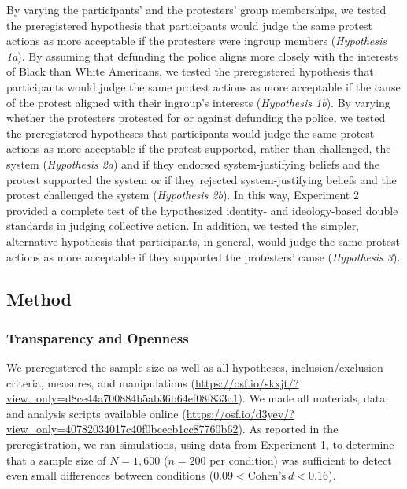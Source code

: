 \documentclass[12pt, letterpaper]{article}
\begin{document}
By varying the participants' and the protesters' group memberships, we
tested the preregistered hypothesis that participants would judge the
same protest actions as more acceptable if the protesters were ingroup
members (\emph{Hypothesis 1a}). By assuming that defunding the police
aligns more closely with the interests of Black than White Americans, we
tested the preregistered hypothesis that participants would judge the
same protest actions as more acceptable if the cause of the protest
aligned with their ingroup's interests (\emph{Hypothesis 1b}). By
varying whether the protesters protested for or against defunding the
police, we tested the preregistered hypotheses that participants would
judge the same protest actions as more acceptable if the protest
supported, rather than challenged, the system (\emph{Hypothesis 2a}) and
if they endorsed system-justifying beliefs and the protest supported the
system or if they rejected system-justifying beliefs and the protest
challenged the system (\emph{Hypothesis 2b}). In this way, Experiment 2
provided a complete test of the hypothesized identity- and
ideology-based double standards in judging collective action. In
addition, we tested the simpler, alternative hypothesis that
participants, in general, would judge the same protest actions as more
acceptable if they supported the protesters' cause (\emph{Hypothesis
3}).

\hypertarget{method-1}{%
\subsection{Method}\label{method-1}}

\hypertarget{transparency-and-openness-1}{%
\subsubsection{Transparency and
Openness}\label{transparency-and-openness-1}}

We preregistered the sample size as well as all hypotheses,
inclusion/exclusion criteria, measures, and manipulations
(\url{https://osf.io/skxjt/?view_only=d8ce44a700884b5ab36b64ef08f833a1}).
We made all materials, data, and analysis scripts available online
(\url{https://osf.io/d3yev/?view_only=40782034017c40f0bcecb1cc87760b62}).
As reported in the preregistration, we ran simulations, using data from
Experiment 1, to determine that a sample size of \(N = 1,600\)
(\(n = 200\) per condition) was sufficient to detect even small
differences between conditions (\(0.09 < \text{Cohen's}~d < 0.16\)).
\end{document}
